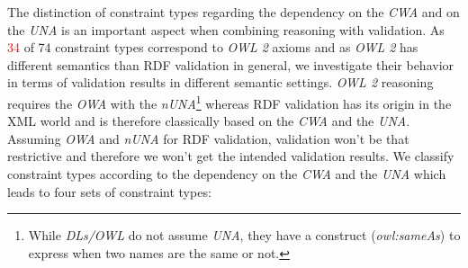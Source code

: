 \documentclass{acm_proc_article-sp}
\newcommand{\ms}[1]{%
  \texttt{#1}
}
\begin{document}

The distinction of constraint types regarding the dependency on the \emph{CWA} and on the \emph{UNA} is an important aspect when combining reasoning with validation.
As \textcolor{red}{34} of 74 constraint types correspond to \emph{OWL 2} axioms and as \emph{OWL 2} has different semantics than RDF validation in general, 
we investigate their behavior in terms of validation results in different semantic settings. 
\emph{OWL 2} reasoning requires the \emph{OWA} with the \emph{nUNA}\footnote{While \emph{DLs/OWL} do not assume \emph{UNA}, they have a construct (\emph{owl:sameAs}) to express when two names are the same or not.
} whereas RDF validation has its origin in the XML world and is therefore classically based on the \emph{CWA} and the \emph{UNA}.
Assuming \emph{OWA} and \emph{nUNA} for RDF validation, validation won’t be that restrictive and therefore we won’t get the intended validation results.
We classify constraint types according to the dependency on the \emph{CWA} and the \emph{UNA} which leads to four sets of constraint types:
\end{document}

